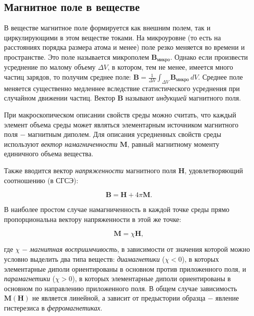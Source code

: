 \documentclass[a4paper,12pt]{article} %
\begin{document}
\subsection{Магнитное поле в веществе}
\hfill \break В веществе магнитное поле формируется как внешним полем, так и циркулирующими в этом веществе токами. На микроуровне (то есть на расстояниях порядка размера атома и менее) поле резко меняется во времени и пространстве. Это поле называется микрополем $\textbf{B}_\text{микро}$. Однако если произвести усреднение по малому объему $\Delta V$, в котором, тем не менее, имеется много частиц зарядов, то получим среднее поле: $\textbf{B} = \frac{1}{\Delta V} \int_{\Delta V} \textbf{B}_\text{микро} \,dV$. Среднее поле меняется существенно медленнее вследствие статистического усреднения при случайном движении частиц. Вектор $\textbf{B}$ называют \textit{индукцией} магнитного поля.

\hfill \break При макроскопическом описании свойств среды можно считать, что каждый элемент объема среды может являться элементарным источником магнитного поля $-$ магнитным диполем. Для описания усредненных свойств среды используют \textit{вектор намагниченности} $\textbf{M}$, равный магнитному моменту единичного объема вещества.

\hfill \break Также вводится вектор \textit{напряженности} магнитного поля $\textbf{H}$, удовлетворяющий соотношению (в СГСЭ):

\begin{equation}\label{ linkname }
\textbf{B} = \textbf{H}+4\pi \textbf{M}.
\end{equation}

\hfill \break В наиболее простом случае намагниченность в каждой точке среды прямо пропорциональна вектору напряженности в этой же точке:

\begin{equation}\label{ linkname }
\textbf{M} = \chi \textbf{H},
\end{equation}

\hfill \break где $\chi$ $-$ \textit{магнитная восприимчивость}, в зависимости от значения которой можно условно выделить два типа веществ: \textit{диамагнетики} ($\chi < 0$), в которых элементарные диполи ориентированы в основном против приложенного поля, и \textit{парамагнетики} ($\chi > 0$), в которых элементарные диполи ориентированы в основном по направлению приложенного поля. В общем случае зависимость $\textbf{M}(\textbf{H})$ не является линейной, а зависит от предыстории образца $-$ явление гистерезиса в \textit{ферромагнетиках}.
\end{document}
